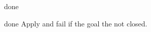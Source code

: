 \begin{tactic}{done}
  \begin{tsyntax}[empty]{done}
  Apply  and fail if the goal the not closed.
  \end{tsyntax}
\end{tactic}
